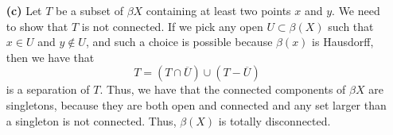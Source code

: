 \documentclass{article}
\begin{document}
\begin{enumerate}
\begin{proof}
    inclusion let $u$ be point of $\overline{U}$ and let $V$ be a
    neighborhood of $u$. Then we see that $V \cap U \neq \emptyset$
    because $u \in \overline{U}$. Consequently,
    \[
    (V \cap U) \cap X = V \cap (U\cap X) \neq \emptyset
    \]
    because $X$ is dense. So $x \in \overline{U\cap X}$, which gives
    the reverse inclusion so we are done.
  \end{proof}
  With the clain in hand we apply the lemma to the set $U\cap X$ to
  get that $\overline{U\cap X} = \overline{U}$ is both open and
  closed.
\item [\textbf{(c)}] Let $T$ be a subset of $\beta{X}$ containing at
  least two points $x$ and $y$. We need to show that $T$ is not
  connected. If we pick any open $U \subset \beta(X)$ such that $x \in
  U$ and $y \not\in U$, and such a choice is possible because
  $\beta(x)$ is Hausdorff, then we have that
  \[
  T = (T \cap \overline{U})\cup (T - \overline{U})
  \]
  is a separation of $T$. Thus, we have that the connected components
  of $\beta{X}$ are singletons, because they are both open and
  connected and any set larger than a singleton is not
  connected. Thus, $\beta(X)$ is totally disconnected.
\end{enumerate}
\end{document}
